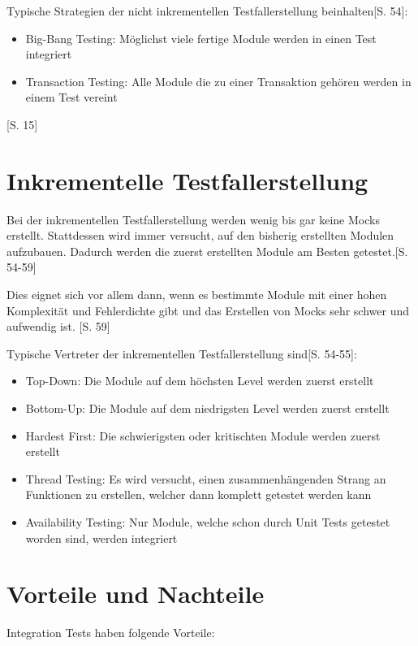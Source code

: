 \documentclass[a4paper,bibtotoc,oneside]{scrbook}
\begin{document}
Typische Strategien der nicht inkrementellen Testfallerstellung beinhalten\cite{test_large_systems}[S. 54]:

\begin{itemize}
  \item Big-Bang Testing: Möglichst viele fertige Module werden in einen Test integriert
  \item Transaction Testing: Alle Module die zu einer Transaktion gehören werden in einem Test vereint
\end{itemize}

\cite{eval_regression}[S. 15]
\section{Inkrementelle Testfallerstellung}
Bei der inkrementellen Testfallerstellung werden wenig bis gar keine Mocks erstellt. Stattdessen wird immer versucht, auf den bisherig erstellten Modulen aufzubauen. Dadurch werden die zuerst erstellten Module am Besten getestet.\cite{test_large_systems}[S. 54-59]

Dies eignet sich vor allem dann, wenn es bestimmte Module mit einer hohen Komplexität und Fehlerdichte gibt und das Erstellen von Mocks sehr schwer und aufwendig ist. \cite{test_large_systems}[S. 59]

Typische Vertreter der inkrementellen Testfallerstellung sind\cite{test_large_systems}[S. 54-55]:

\begin{itemize}
  \item Top-Down: Die Module auf dem höchsten Level werden zuerst erstellt
  \item Bottom-Up: Die Module auf dem niedrigsten Level werden zuerst erstellt
  \item Hardest First: Die schwierigsten oder kritischten Module werden zuerst erstellt
  \item Thread Testing: Es wird versucht, einen zusammenhängenden Strang an Funktionen zu erstellen, welcher dann komplett getestet werden kann
  \item Availability Testing: Nur Module, welche schon durch Unit Tests getestet worden sind, werden integriert
\end{itemize}

\section{Vorteile und Nachteile}
Integration Tests haben folgende Vorteile:
\end{document}
